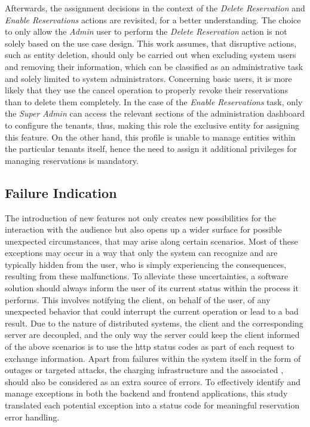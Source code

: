\newpage

\noindent Afterwards, the assignment decisions in the context of the \textit{Delete Reservation} and \textit{Enable Reservations} actions are revisited, for a better understanding. The choice to only allow the \textit{Admin} user to perform the \textit{Delete Reservation} action is not solely based on the use case design.
This work assumes, that disruptive actions, such as entity deletion, should only be carried out when excluding system users and removing their information, which can be classified as an administrative task and solely limited to system administrators.
Concerning basic users, it is more likely that they use the cancel operation to properly revoke their reservations than to delete them completely.
In the case of the \textit{Enable Reservations} task, only the \textit{Super Admin} can access the relevant sections of the administration dashboard to configure the tenants, thus, making this role the exclusive entity for assigning this feature. 
On the other hand, this profile is unable to manage entities within the particular tenants itself, hence the need to assign it additional privileges for managing reservations is mandatory. 

\newpage

\subsection{Failure Indication}
\label{ch:Implementation:sec:Reservation System:ssec:Failure Indication}

The introduction of new features not only creates new possibilities for the interaction with the audience but also opens up a wider surface for possible unexpected circumstances, that may arise along certain scenarios. 
Most of these exceptions may occur in a way that only the system can recognize and are typically hidden from the user, who is simply experiencing the consequences, resulting from these malfunctions.
To alleviate these uncertainties, a software solution should always inform the user of its current status within the process it performs. This involves notifying the client, on behalf of the user, of any unexpected behavior that could interrupt the current operation or lead to a bad result.
Due to the nature of distributed systems, the client and the corresponding server are decoupled, and the only way the server could keep the client informed of the above scenarios is to use the \acrshort{http} status codes as part of each request to exchange information.
Apart from failures within the system itself in the form of outages or targeted attacks, the charging infrastructure and the associated , should also be considered as an extra source of errors. 
To effectively identify and manage exceptions in both the backend and frontend applications, this study translated each potential exception into a status code for meaningful reservation error handling.

